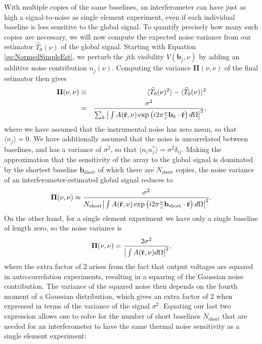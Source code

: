 \documentclass[twocolumn,apj,numberedappendix]{emulateapj}
\newcommand{\rhat}{\hat{\mathbf{r}}}
\begin{document}
With multiple copies of the same baselines, an interferometer can have just as high a signal-to-noise as single element experiment, even if each individual baseline is less sensitive to the global signal. To quantify precisely how many such copies are necessary, we will now compute the expected noise variance from our estimator $\widehat{T}_0 (\nu) $ of the global signal. Starting with Equation \eqref{eq:NormedSimpleEst}, we perturb the $j$th visibility $V(\mathbf{b}_j, \nu)$ by adding an additive noise contribution $n_j (\nu)$. Computing the variance $\boldsymbol \Pi(\nu,\nu)$ of the final estimator then gives
\begin{eqnarray}
\boldsymbol \Pi(\nu,\nu) &\equiv& \langle \widehat{T}_0 (\nu)^2 \rangle - \langle  \widehat{T}_0 (\nu) \rangle^2 \nonumber \\
&=&  \frac{\sigma^2}{ \sum_k \big{|} \int  A(\rhat, \nu) \exp\left(i 2\pi \frac{\nu }{c}\mathbf{b}_k \cdot \rhat \right)d\Omega \big{|}^2},
\end{eqnarray}
where we have assumed that the instrumental noise has zero mean, so that $\langle n_j \rangle = 0$. We have additionally assumed that the noise is uncorrelated between baselines, and has a variance of $\sigma^2$, so that $\langle n_i n_j^* \rangle = \sigma^2 \delta_{ij}$. Making the approximation that the sensitivity of the array to the global signal is dominated by the shortest baseline $\mathbf{b}_\textrm{short}$ of which there are $N_\textrm{short}$ copies, the noise variance of an interferometer-estimated global signal reduces to
\begin{equation}
\boldsymbol \Pi(\nu,\nu) \approx \frac{\sigma^2}{ N_\textrm{short} \big{|} \int  A(\rhat, \nu) \exp\left(i 2\pi \frac{\nu }{c}\mathbf{b}_\textrm{short} \cdot \rhat \right)d\Omega \big{|}^2}.
\end{equation}
On the other hand, for a single element experiment we have only a single baseline of length zero, so the noise variance is
\begin{equation}
\boldsymbol \Pi(\nu,\nu) = \frac{2 \sigma^2}{\big{|} \int  A(\rhat, \nu) d\Omega \big{|}^2},
\end{equation}
where the extra factor of $2$ arises from the fact that output voltages are squared in auto-correlation experiments, resulting in a squaring of the Gaussian noise contribution. The variance of the squared noise then depends on the fourth moment of a Gaussian distribution, which gives an extra factor of $2$ when expressed in terms of the variance of the signal $\sigma^2$. Equating our last two expression allows one to solve for the number of short baselines $N_\textrm{short}$ that are needed for an interferometer to have the same thermal noise sensitivity as a single element experiment:
\end{document}
